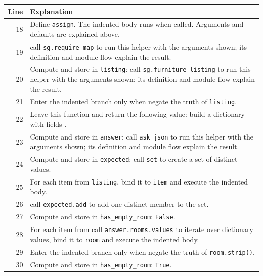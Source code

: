\documentclass[11pt,a4paper]{book}
\begin{document}
\begin{longtable}{r p{}}

\textbf{Line} & \textbf{Explanation} \\ \hline \endhead

18 & Define \texttt{assign}. The indented body runs when called. Arguments and defaults are explained above. \\

19 & call \texttt{sg.require\_map} to run this helper with the arguments shown; its definition and module flow explain the result. \\

20 & Compute and store in \texttt{listing}: call \texttt{sg.furniture\_listing} to run this helper with the arguments shown; its definition and module flow explain the result.  \\

21 & Enter the indented branch only when negate the truth of \texttt{listing}. \\

22 & Leave this function and return the following value: build a dictionary with fields \texttt{}. \\

23 & Compute and store in \texttt{answer}: call \texttt{ask\_json} to run this helper with the arguments shown; its definition and module flow explain the result.  \\

24 & Compute and store in \texttt{expected}: call \texttt{set} to create a set of distinct values.  \\

25 & For each item from \texttt{listing}, bind it to \texttt{item} and execute the indented body. \\

26 & call \texttt{expected.add} to add one distinct member to the set. \\

27 & Compute and store in \texttt{has\_empty\_room}: \texttt{False}.  \\

28 & For each item from call \texttt{answer.rooms.values} to iterate over dictionary values, bind it to \texttt{room} and execute the indented body. \\

29 & Enter the indented branch only when negate the truth of \texttt{room.strip()}. \\

30 & Compute and store in \texttt{has\_empty\_room}: \texttt{True}.  \\


\end{longtable}
\end{document}
